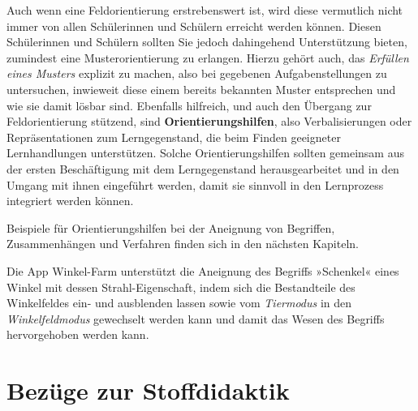 \documentclass[
]{scrbook}
\renewenvironment{quote}{
  \list{}{
	\leftmargin0.2cm   %
    \rightmargin\leftmargin
      	\def\FrameCommand
    {%
        {\color{quoteColor}\vrule width 2pt}%
        \hspace{0pt}%
    }%
    \MakeFramed{\advance \hsize -\width \FrameRestore}    \color{quoteColor}
    }
  \item\relax
}
{\endlist\color{black}\endMakeFramed}
\theoremstyle{definition}
\theoremstyle{definition}
\theoremstyle{definition}
\theoremstyle{definition}
\theoremstyle{remark}
\begin{document}
Auch wenn eine Feldorientierung erstrebenswert ist, wird diese vermutlich nicht immer von allen Schülerinnen und Schülern erreicht werden können. Diesen Schülerinnen und Schülern sollten Sie jedoch dahingehend Unterstützung bieten, zumindest eine Musterorientierung zu erlangen. Hierzu gehört auch, das \emph{Erfüllen eines Musters} explizit zu machen, also bei gegebenen Aufgabenstellungen zu untersuchen, inwieweit diese einem bereits bekannten Muster entsprechen und wie sie damit lösbar sind. Ebenfalls hilfreich, und auch den Übergang zur Feldorientierung stützend, sind \textbf{Orientierungshilfen}, also Verbalisierungen oder Repräsentationen zum Lerngegenstand, die beim Finden geeigneter Lernhandlungen unterstützen. Solche Orientierungshilfen sollten gemeinsam aus der ersten Beschäftigung mit dem Lerngegenstand herausgearbeitet und in den Umgang mit ihnen eingeführt werden, damit sie sinnvoll in den Lernprozess integriert werden können.

Beispiele für Orientierungshilfen bei der Aneignung von Begriffen, Zusammenhängen und Verfahren finden sich in den nächsten Kapiteln.

\begin{quote}
Die App Winkel-Farm unterstützt die Aneignung des Begriffs »Schenkel« eines Winkel mit dessen Strahl-Eigenschaft, indem sich die Bestandteile des Winkelfeldes ein- und ausblenden lassen sowie vom \emph{Tiermodus} in den \emph{Winkelfeldmodus} gewechselt werden kann und damit das Wesen des Begriffs hervorgehoben werden kann.
\end{quote}

\section{Bezüge zur Stoffdidaktik}\label{bezuege-zur-stoffdidaktik}
\end{document}
